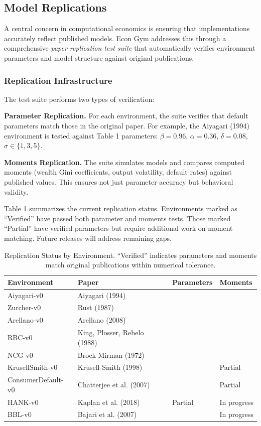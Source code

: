 \documentclass[12pt]{article}
\newcommand{\cmark}{\ding{51}}
\begin{document}
\subsection{Model Replications}

A central concern in computational economics is ensuring that implementations accurately reflect published models. Econ Gym addresses this through a comprehensive \textit{paper replication test suite} that automatically verifies environment parameters and model structure against original publications.

\subsubsection{Replication Infrastructure}

The test suite performs two types of verification:

\textbf{Parameter Replication.} For each environment, the suite verifies that default parameters match those in the original paper. For example, the Aiyagari (1994) environment is tested against Table 1 parameters: $\beta = 0.96$, $\alpha = 0.36$, $\delta = 0.08$, $\sigma \in \{1, 3, 5\}$.

\textbf{Moments Replication.} The suite simulates models and compares computed moments (wealth Gini coefficients, output volatility, default rates) against published values. This ensures not just parameter accuracy but behavioral validity.

Table \ref{tab:replication_status} summarizes the current replication status. Environments marked as ``Verified'' have passed both parameter and moments tests. Those marked ``Partial'' have verified parameters but require additional work on moment matching. Future releases will address remaining gaps.

\begin{table}[H]
\centering
\begin{tabular}{llll}
\toprule
Environment & Paper & Parameters & Moments \\
\midrule
Aiyagari-v0 & Aiyagari (1994) & \cmark & \cmark \\
Zurcher-v0 & Rust (1987) & \cmark & \cmark \\
Arellano-v0 & Arellano (2008) & \cmark & \cmark \\
RBC-v0 & King, Plosser, Rebelo (1988) & \cmark & \cmark \\
NCG-v0 & Brock-Mirman (1972) & \cmark & \cmark \\
KrusellSmith-v0 & Krusell-Smith (1998) & \cmark & Partial \\
ConsumerDefault-v0 & Chatterjee et al. (2007) & \cmark & Partial \\
HANK-v0 & Kaplan et al. (2018) & Partial & In progress \\
BBL-v0 & Bajari et al. (2007) & \cmark & In progress \\
\bottomrule
\end{tabular}
\caption{Replication Status by Environment. ``Verified'' indicates parameters and moments match original publications within numerical tolerance.}
\label{tab:replication_status}
\end{table}
\end{document}
